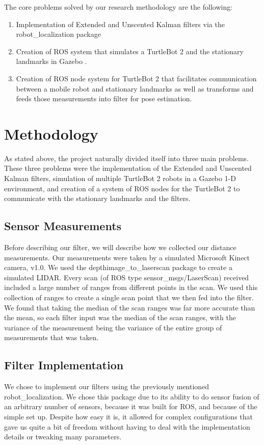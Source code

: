 \documentclass[conference]{IEEEtran} \usepackage[T1]{fontenc} \usepackage[backend=biber, style=ieee]{biblatex}
\begin{document}
The core problems solved by our research methodology are the following:
\begin{enumerate}
\item Implementation of Extended and Unscented Kalman filters via the robot\_localization package \cite{robot_localization}
\item Creation of ROS system that simulates a TurtleBot 2 and the stationary landmarks in Gazebo \cite{gazebo}.
\item Creation of ROS node system for TurtleBot 2 that facilitates communication between a mobile robot and stationary 
landmarks as well as transforms and feeds those measurements into filter for pose estimation. 
\end{enumerate} 

\section{Methodology} \label{Methodology} As stated above, the project naturally divided itself into three main
problems. These three problems were the implementation of the Extended and Unscented Kalman filters, simulation of multiple
TurtleBot 2 robots in a Gazebo 1-D environment, and creation of a system of ROS nodes for the TurtleBot 2 to communicate with
the stationary landmarks and the filters.

\subsection{Sensor Measurements} \label{Sensor Measurements} Before describing our filter, we will describe how we
collected our distance measurements. Our measurements were taken by a simulated Microsoft Kinect camera, v1.0. We used
the depthimage\_to\_laserscan package \cite{depth_to_scan} to create a simulated LIDAR. Every scan (of ROS type
sensor\_msgs/LaserScan) received included a large number of ranges from different points in the scan. We used this
collection of ranges to create a single scan point that we then fed into the filter. We found that taking the median of
the scan ranges was far more accurate than the mean, so each filter input was the median of the scan ranges, with the
variance of the measurement being the variance of the entire group of measurements that was taken.

\subsection{Filter Implementation} \label{Filter Implementation} We chose to implement our filters using the previously
mentioned robot\_localization. We chose this package due to its ability to do sensor fusion of an arbitrary number of
sensors, because it was built for ROS, and because of the simple set up. Despite how easy it is, it allowed for complex configurations 
that gave us quite a bit of freedom without having to deal with the implementation details or tweaking many parameters.  
\end{document}
